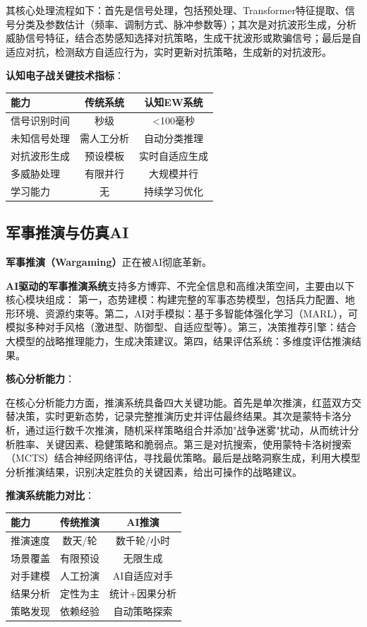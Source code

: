 其核心处理流程如下：首先是信号处理，包括预处理、Transformer特征提取、信号分类及参数估计（频率、调制方式、脉冲参数等）；其次是对抗波形生成，分析威胁信号特征，结合态势感知选择对抗策略，生成干扰波形或欺骗信号；最后是自适应对抗，检测敌方自适应行为，实时更新对抗策略，生成新的对抗波形。

\textbf{认知电子战关键技术指标}：

\begin{center}
\begin{tabular}{lcc}
\toprule
\textbf{能力} & \textbf{传统系统} & \textbf{认知EW系统} \\
\midrule
信号识别时间 & 秒级 & <100毫秒 \\
未知信号处理 & 需人工分析 & 自动分类推理 \\
对抗波形生成 & 预设模板 & 实时自适应生成 \\
多威胁处理 & 有限并行 & 大规模并行 \\
学习能力 & 无 & 持续学习优化 \\
\bottomrule
\end{tabular}
\end{center}

\subsection{军事推演与仿真AI}

\textbf{军事推演（Wargaming）}正在被AI彻底革新。

\textbf{AI驱动的军事推演系统}支持多方博弈、不完全信息和高维决策空间，主要由以下核心模块组成：
第一，态势建模：构建完整的军事态势模型，包括兵力配置、地形环境、资源约束等。第二，AI对手模拟：基于多智能体强化学习（MARL），可模拟多种对手风格（激进型、防御型、自适应型等）。第三，决策推荐引擎：结合大模型的战略推理能力，生成决策建议。第四，结果评估系统：多维度评估推演结果。

\textbf{核心分析能力}：

在核心分析能力方面，推演系统具备四大关键功能。首先是单次推演，红蓝双方交替决策，实时更新态势，记录完整推演历史并评估最终结果。其次是蒙特卡洛分析，通过运行数千次推演，随机采样策略组合并添加"战争迷雾"扰动，从而统计分析胜率、关键因素、稳健策略和脆弱点。第三是对抗搜索，使用蒙特卡洛树搜索（MCTS）结合神经网络评估，寻找最优策略。最后是战略洞察生成，利用大模型分析推演结果，识别决定胜负的关键因素，给出可操作的战略建议。

\textbf{推演系统能力对比}：

\begin{center}
\begin{tabular}{p{4cm}cc}
\toprule
\textbf{能力} & \textbf{传统推演} & \textbf{AI推演} \\
\midrule
推演速度 & 数天/轮 & 数千轮/小时 \\
场景覆盖 & 有限预设 & 无限生成 \\
对手建模 & 人工扮演 & AI自适应对手 \\
结果分析 & 定性为主 & 统计+因果分析 \\
策略发现 & 依赖经验 & 自动策略探索 \\
\bottomrule
\end{tabular}
\end{center}

